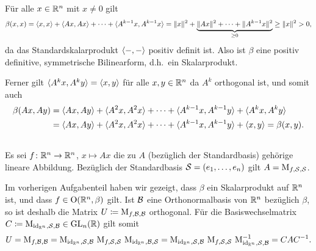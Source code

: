 \section{}





\subsection{}

Für alle $x \in \mathbb{R}^n$ mit $x \neq 0$ gilt
\[
        \beta(x,x)
  =     \langle x, x \rangle + \langle A x, A x \rangle + \dotsb + \langle A^{k-1} x, A^{k-1} x \rangle
  =     \|x\|^2 + \underbrace{ \|A x\|^2 + \dotsb + \|A^{k-1} x\|^2 }_{\geq 0}
  \geq  \|x\|^2
  >     0,
\]
da das Standardskalarprodukt $\langle -, - \rangle$ positiv definit ist.
Also ist $\beta$ eine positiv definitive, symmetrische Bilinearform, d.h.\ ein Skalarprodukt.

Ferner gilt $\langle A^k x, A^k y \rangle = \langle x, y \rangle$ für alle $x, y \in \mathbb{R}^n$ da $A^k$ orthogonal ist, und somit auch
\begin{align*}
     \beta(A x, A y)
  &= \langle A x, A y \rangle + \langle A^2 x, A^2 x \rangle + \dotsb + \langle A^{k-1} x, A^{k-1} y \rangle + \langle A^k x, A^k y \rangle
  \\
  &= \langle A x, A y \rangle + \langle A^2 x, A^2 x \rangle + \dotsb + \langle A^{k-1} x, A^{k-1} y \rangle + \langle x, y \rangle
   = \beta(x, y).
\end{align*}





\subsection{}

Es sei $f \colon \mathbb{R}^n \to \mathbb{R}^n$, $x \mapsto Ax$ die zu $A$ (bezüglich der Standardbasis) gehörige lineare Abbildung.
Bezüglich der Standardbasis $\mathcal{S} = (e_1, \dotsc, e_n)$ gilt $A = \operatorname{M}_{f, \mathcal{S}, \mathcal{S}}$.

Im vorherigen Aufgabenteil haben wir gezeigt, dass $\beta$ ein Skalarprodukt auf $\mathbb{R}^n$ ist, und dass $f \in \operatorname{O}(\mathbb{R}^n, \beta)$ gilt.
Ist $\mathcal{B}$ eine Orthonormalbasis von $\mathbb{R}^n$ bezüglich $\beta$, so ist deshalb die Matrix $U \coloneqq \operatorname{M}_{f, \mathcal{B}, \mathcal{B}}$ orthogonal.
Für die Basiswechselmatrix $C \coloneqq \operatorname{M}_{\operatorname{id}_{\mathbb{R}^n}, \mathcal{S}, \mathcal{B}} \in \operatorname{GL}_{n}(\mathbb{R})$ gilt somit
\[
      U
  =   \operatorname{M}_{f, \mathcal{B}, \mathcal{B}}
  =   \operatorname{M}_{\operatorname{id}_{\mathbb{R}^n}, \mathcal{S}, \mathcal{B}}
  \,  \operatorname{M}_{f, \mathcal{S}, \mathcal{S}}
  \,  \operatorname{M}_{\operatorname{id}_{\mathbb{R}^n}, \mathcal{B}, \mathcal{S}}
  =   \operatorname{M}_{\operatorname{id}_{\mathbb{R}^n}, \mathcal{S}, \mathcal{B}}
  \,  \operatorname{M}_{f, \mathcal{S}, \mathcal{S}}
  \,  \operatorname{M}_{\operatorname{id}_{\mathbb{R}^n}, \mathcal{S}, \mathcal{B}}^{-1}
  =   C A C^{-1}.
\]

